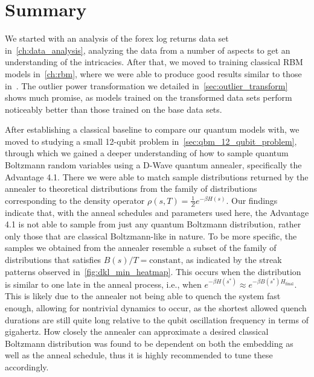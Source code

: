 \section{Summary}
We started with an analysis of the forex log returns data set in~\cref{ch:data_analysis}, analyzing the data from a number of aspects to get an understanding of the intricacies.
After that, we moved to training classical RBM models in~\cref{ch:rbm}, where we were able to produce good results similar to those in~\cite{kondratyev_2019}.
The outlier power transformation we detailed in~\cref{sec:outlier_transform} shows much promise, as models trained on the transformed data sets perform noticeably better than those trained on the base data sets.

After establishing a classical baseline to compare our quantum models with, we moved to studying a small 12-qubit problem in~\cref{sec:qbm_12_qubit_problem}, through which we gained a deeper understanding of how to sample quantum Boltzmann random variables using a D-Wave quantum annealer, specifically the Advantage 4.1.
There we were able to match sample distributions returned by the annealer to theoretical distributions from the family of distributions corresponding to the density operator \( \rho(s,T) = \frac{1}{Z}e^{-\beta H(s)} \).
Our findings indicate that, with the anneal schedules and parameters used here, the Advantage 4.1 is not able to sample from just any quantum Boltzmann distribution, rather only those that are classical Boltzmann-like in nature.
To be more specific, the samples we obtained from the annealer resemble a subset of the family of distributions that satisfies \( B(s) / T = \text{constant} \), as indicated by the streak patterns observed in~\cref{fig:dkl_min_heatmap}.
This occurs when the distribution is similar to one late in the anneal process, i.e., when \( e^{-\beta H(s^*)} \approx e^{-\beta B(s^*) H_\text{final}} \).
This is likely due to the annealer not being able to quench the system fast enough, allowing for nontrivial dynamics to occur, as the shortest allowed quench durations are still quite long relative to the qubit oscillation frequency in terms of gigahertz.
How closely the annealer can approximate a desired classical Boltzmann distribution was found to be dependent on both the embedding as well as the anneal schedule, thus it is highly recommended to tune these accordingly.

